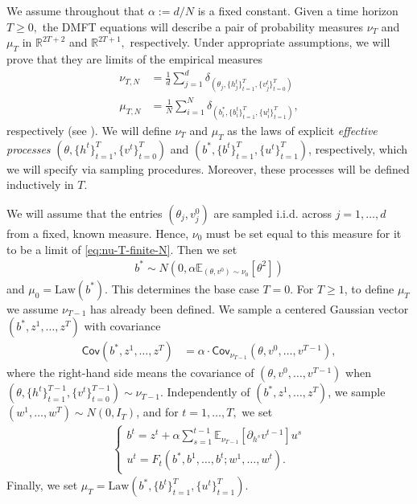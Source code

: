 \documentclass{article}
\newcommand{\1}{\mathbbm{1}}
\theoremstyle{plain}
\theoremstyle{definition}
\theoremstyle{remark}
\newcommand{\E}{\mathbb{E}}
\newcommand{\Law}{\mathrm{Law}}
\newcommand{\Cov}{\mathsf{Cov}}
\newcommand{\R}{\mathbb{R}}
\begin{document}
We assume throughout that $\alpha := d/N$ is a fixed constant. Given a time horizon $T \geq 0,$ the DMFT equations will describe a pair of probability measures $\nu_T$ and $\mu_T$ in $\R^{2T+2}$ and $\R^{2T+1},$ respectively. Under appropriate assumptions, we will prove that they are limits of the empirical measures
\begin{align}
    \nu_{T,N} &= \frac{1}{d}\sum_{j=1}^d \delta_{(\theta_j, \{h^t_j\}_{t=1}^T, \{v^t_j\}_{t=0}^T )} \label{eq:nu-T-finite-N}\\
    \mu_{T,N} &= \frac{1}{N}\sum_{i=1}^N \delta_{(b^*_i, \{b^t_i\}_{t=1}^T, \{u^t_i\}_{t=1}^T )},\label{eq:mu-T-finite-N}
\end{align}
respectively (see ). We will define $\nu_T$ and $\mu_T$ as the laws of explicit \emph{effective processes} $(\theta, \{h^t\}_{t=1}^T,\{v^t\}_{t=0}^T)$ and $(b^*, \{b^t\}_{t=1}^T,\{u^t\}_{t=1}^T)$, respectively, which we will specify via sampling procedures. Moreover, these processes will be defined inductively in $T.$

We will assume that the entries $(\theta_j,v^0_j)$ are sampled i.i.d. across $j=1,\dots,d$ from a fixed, known measure. Hence, $\nu_0$ must be set equal to this measure for it to be a limit of \eqref{eq:nu-T-finite-N}. Then we set
\begin{align}\label{eq:mu-0-base-case}
    b^* \sim N(0,\alpha \E_{(\theta,v^0)\sim \nu_0}[\theta^2])
\end{align}
and $\mu_0 = \Law(b^*).$ This determines the base case $T=0.$ For $T\geq 1$, to define $\mu_T$ we assume $\nu_{T-1}$ has already been defined. We sample a centered Gaussian vector $(b^*, z^1,\dots,z^T)$ with covariance
\begin{align}\label{eq:nu-T-covariance}
    \Cov(b^*, z^1,\dots,z^T) &= \alpha\cdot \Cov_{\nu_{T-1}} (\theta, v^0,\dots,v^{T-1}),
\end{align}
where the right-hand side means the covariance of $(\theta, v^0,\dots,v^{T-1})$ when $(\theta, \{h^t\}_{t=1}^{T-1},\{v^t\}_{t=0}^{T-1})\sim \nu_{T-1}.$ Independently of $(b^*, z^1,\dots,z^T)$, we sample $(w^1,\dots,w^T) \sim N(0,I_T)$, and for $t=1,\dots,T,$ we set
\begin{align}\label{eq:mu-T-recursion}
\begin{cases}
    b^t = z^t + \alpha \sum_{s=1}^{t-1} \E_{\nu_{T-1}}[\partial_{h^s} v^{t-1}]u^s \\
    u^t = F_t(b^*,b^1,\dots,b^t;w^1,\dots,w^t).
\end{cases}
\end{align}
Finally, we set $\mu_T = \Law(b^*, \{b^t\}_{t=1}^T, \{u^t\}_{t=1}^T).$
\end{document}
